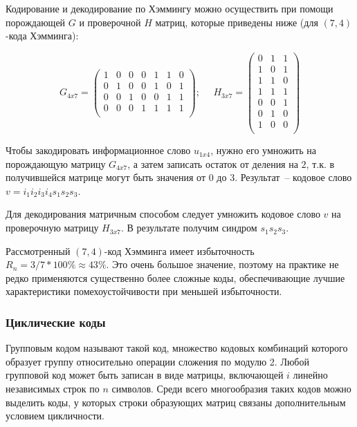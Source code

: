 \documentclass[12pt,a4paper]{article}
\begin{document}
  Кодирование и декодирование по Хэммингу можно осуществить при помощи порождающей $G$ и проверочной $H$ матриц, которые приведены ниже (для $(7,4)$-кода Хэмминга):

\[
  G_{4x7}=
	\begin{pmatrix} 
		1 & 0 & 0 & 0 & 1 & 1 & 0 \\ 
		0 & 1 & 0 & 0 & 1 & 0 & 1 \\ 
		0 & 0 & 1 & 0 & 0 & 1 & 1 \\ 
		0 & 0 & 0 & 1 & 1 & 1 & 1 \\ 
  \end{pmatrix}
  ;\text{~~~~}
  H_{3x7}=  
  \begin{pmatrix}
		0 & 1 & 1 \\
		1 & 0 & 1 \\
		1 & 1 & 0 \\
		1 & 1 & 1 \\
		0 & 0 & 1 \\
		0 & 1 & 0 \\
		1 & 0 & 0 \\ 
  \end{pmatrix}
\]
  
  Чтобы закодировать информационное слово $u_{1x4}$, нужно его умножить на порождающую матрицу $G_{4x7}$, а затем записать остаток от деления на $2$, т.к. в получившейся матрице могут быть значения от $0$ до $3$. Результат~-- кодовое слово $v=i_1i_2i_3i_4s_1s_2s_3$.
  
  Для декодирования матричным способом следует умножить кодовое слово $v$ на проверочную матрицу $H_{3x7}$. В результате получим синдром $s_1s_2s_3$.
  
  Рассмотренный $(7,4)$-код Хэмминга имеет избыточность $R_n=3/7*100\%\approx 43\%$. Это очень большое значение, поэтому на практике не редко применяются существенно более сложные коды, обеспечивающие лучшие характеристики помехоустойчивости при меньшей избыточности. 

\subsubsection{Циклические коды}
  
  Групповым кодом называют такой код, множество кодовых комбинаций которого образует группу относительно операции сложения по модулю 2. Любой групповой код может быть записан в виде матрицы, включающей $i$ линейно независимых строк по $n$ символов. Среди всего многообразия таких кодов можно выделить коды, у которых строки образующих матриц связаны дополнительным условием цикличности.
  
\end{document}
